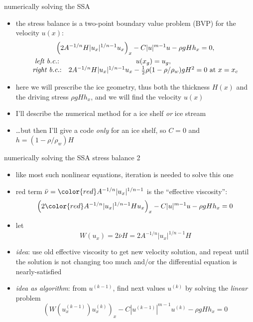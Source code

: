 \begin{frame}{numerically solving the SSA}

\begin{itemize}
\item the stress balance is a two-point boundary value problem (BVP) for the velocity $u(x)$:
\small
\begin{gather*}
\left(2 A^{-1/n} H |u_x|^{1/n - 1} u_x\right)_x - C|u|^{m-1}u - \rho g H h_x = 0, \\
\begin{matrix}
\text{\emph{left b.c.}:} & u(x_g) = u_g, \\
\text{\emph{right b.c.}:} & 2 A^{-1/n} H |u_x|^{1/n - 1} u_x - \frac{1}{2}\rho (1-\rho/\rho_w) g H^2 = 0 \text{ at } x = x_c
\end{matrix}
\end{gather*}
\normalsize
\item here we will prescribe the ice geometry, thus both the thickness $H(x)$ and the driving stress $\rho g H h_x$, and we will find the velocity $u(x)$
\item I'll describe the numerical method for a ice shelf \emph{or} ice stream
\item \dots but then I'll give a code \emph{only} for an ice shelf, so $C=0$ and $h=(1-\rho/\rho_w)H$
\end{itemize}
\end{frame}


\begin{frame}{numerically solving the SSA stress balance 2}

\begin{itemize}
\item like most such nonlinear equations, iteration is needed to solve this one
\item red term $\bar \nu = {\color{red} A^{-1/n} |u_x|^{1/n-1}}$ is the ``effective viscosity'':
   $$\left(2 {\color{red} A^{-1/n} |u_x|^{1/n-1}} H u_x\right)_x - C |u|^{m-1} u - \rho g H h_x = 0$$
\item let
   $$W(u_x) = 2 \bar \nu H = 2 A^{-1/n} |u_x|^{1/n-1} H$$
\item \emph{idea}: use old effective viscosity to get new velocity solution, and repeat until the solution is not changing too much and/or the differential equation is nearly-satisfied
\item \emph{idea as algorithm}: from $u^{(k-1)}$, find next values $u^{(k)}$ by solving the \emph{linear} problem
   $$\left(W(u^{(k-1)}_x) u^{(k)}_x\right)_x - C |u^{(k-1)}|^{m-1} u^{(k)} - \rho g H h_x = 0$$
\end{itemize}
\end{frame}


